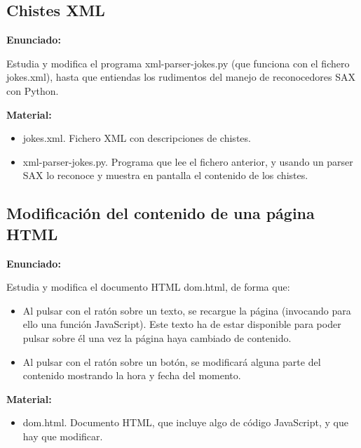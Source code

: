 \subsection{Chistes XML}
\label{subsec:xml-chistes}

\textbf{Enunciado:}

Estudia y modifica el programa xml-parser-jokes.py (que funciona con el fichero jokes.xml), hasta que entiendas los rudimentos del manejo de reconocedores SAX con Python.

\textbf{Material:}

\begin{itemize}
  \item jokes.xml. Fichero XML con descripciones de chistes.
  \item xml-parser-jokes.py. Programa que lee el fichero anterior, y usando un parser SAX lo reconoce y muestra en pantalla el contenido de los chistes.
\end{itemize}

\subsection{Modificación del contenido de una página HTML}
\label{subsec:xml-modificacion-html}

\textbf{Enunciado:}

Estudia y modifica el documento HTML dom.html, de forma que:

\begin{itemize}
\item Al pulsar con el ratón sobre un texto, se recargue la página (invocando para ello una función JavaScript). Este texto ha de estar disponible para poder pulsar sobre él una vez la página haya cambiado de contenido.
\item Al pulsar con el ratón sobre un botón, se modificará alguna parte del contenido mostrando la hora y fecha del momento.
\end{itemize}

\textbf{Material:}

\begin{itemize}
  \item dom.html. Documento HTML, que incluye algo de código JavaScript, y que hay que modificar.
\end{itemize}

